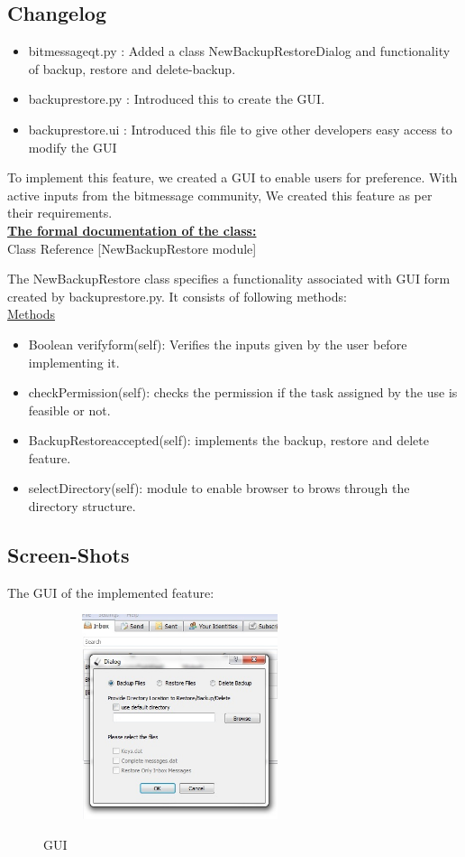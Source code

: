 \documentclass[12pt]{article}
\begin{document}
\subsection{Changelog}
\date{\today}
 
\begin{itemize}
\item bitmessageqt.py  : Added a class NewBackupRestoreDialog and functionality of backup, restore and delete-backup.
\item backuprestore.py : Introduced this to create the GUI.
\item backuprestore.ui : Introduced this file to give other developers easy access to modify the GUI
\end{itemize}

To implement this feature, we created a GUI to enable users for preference. With active inputs from the bitmessage community, We created this feature as per their requirements.\\

\noindent\underline{\bf{The formal documentation of the class:}}\\
\large{Class Reference [NewBackupRestore module]}

The NewBackupRestore class specifies a functionality associated with GUI form created by backuprestore.py. It consists of following methods: \\
\large{\underline{Methods}}
\begin{itemize}
\item Boolean verify\textunderscore form(self): Verifies the inputs given by the user before implementing it.
\item checkPermission(self): checks the permission if the task assigned by the use is feasible or not.
\item BackupRestoreaccepted(self): implements the backup, restore and delete feature. 
\item selectDirectory(self): module to enable browser to brows through the directory structure.
\end{itemize}

\subsection{Screen-Shots}
The GUI of the implemented feature:
\begin{figure}[H]
\begin{center}
    {\label{fig:1} \includegraphics[width=8cm,height=6cm]{2_gui_backup_restore.jpg}}   
  \centering  \caption{GUI}
  \end{center}
\end{figure}
\end{document}
